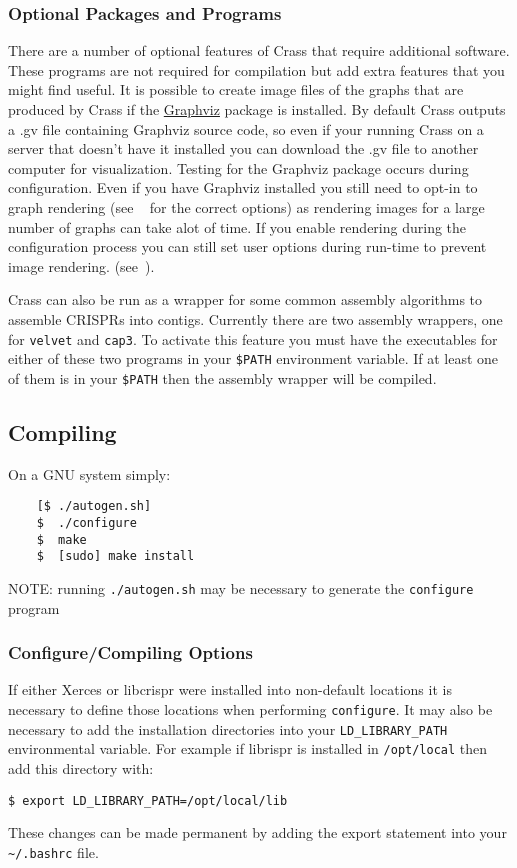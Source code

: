 \documentclass[11pt]{article} %
\begin{document}
\subsubsection{Optional Packages and Programs}
There are a number of optional features of Crass that require additional software.  These programs are not required for compilation but add extra features that you might find useful.  It is possible to create image files of the graphs that are produced by Crass if the \href{www.graphviz.org}{Graphviz} package is installed.  By default Crass outputs a .gv file containing Graphviz source code, so even if your running Crass on a server that doesn't have it installed you can download the .gv file to another computer for visualization.  Testing for the Graphviz package occurs during configuration.  Even if you have Graphviz installed you still need to opt-in to graph rendering (see  ~ for the correct options) as rendering images for a large number of graphs can take alot of time.  If you enable rendering during the configuration process you can still set user options during run-time to prevent image rendering. (see~).

Crass can also be run as a wrapper for some common assembly algorithms to assemble CRISPRs into contigs.  Currently there are two assembly wrappers, one for \texttt{velvet} and \texttt{cap3}. To activate this feature you must have the executables for either of these two programs in your \texttt{\$PATH} environment variable.  If at least one of them is in your \texttt{\$PATH} then the assembly wrapper will be compiled.  

\subsection{Compiling}
On a GNU system simply:
\begin{lstlisting}
	[$ ./autogen.sh]
	$  ./configure
	$  make
	$  [sudo] make install
\end{lstlisting}
NOTE: running \lstinline$./autogen.sh$ may be necessary to generate the \lstinline$configure$ program
\subsubsection{Configure/Compiling Options}
\label{sec:configure}
If either Xerces or libcrispr were installed into non-default locations it is necessary to define those locations when performing \lstinline$configure$.  It may also be necessary to add the installation directories into your \lstinline$LD_LIBRARY_PATH$ environmental variable.  For example if librispr is installed in \lstinline$/opt/local$ then add this directory with: 
\begin{lstlisting}
$ export LD_LIBRARY_PATH=/opt/local/lib
\end{lstlisting}
 These changes can be made permanent by adding the export statement into your \lstinline$~/.bashrc$ file. 
\end{document}
